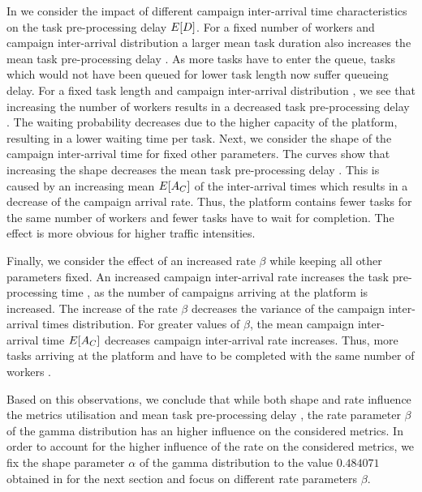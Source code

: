 In  we consider the impact of different campaign inter-arrival time characteristics \campaignIAT on the task pre-processing delay \(E[D]\).
For a fixed number of workers \numberOfWorkers and campaign inter-arrival distribution \campaignIAT a larger mean task duration \taskDuration also increases the mean task pre-processing delay \preTaskProcessingDelay. 
As more tasks have to enter the queue, tasks which would not have been queued for lower task length now suffer queueing delay.
For a fixed task length \taskDuration and campaign inter-arrival distribution \campaignIAT, we see that increasing the number of workers \numberOfWorkers results in a decreased task pre-processing delay \preTaskProcessingDelay.
The waiting probability decreases due to the higher capacity of the platform, resulting in a lower waiting time per task.
Next, we consider the shape of the campaign inter-arrival time for fixed other parameters. 
The curves show that increasing the shape decreases the mean task pre-processing delay \preTaskProcessingDelay. 
This is caused by an increasing mean \(E[A_C]\) of the inter-arrival times which results in a decrease of the campaign arrival rate.
Thus, the platform contains fewer tasks for the same number of workers \numberOfWorkers and fewer tasks have to wait for completion.
The effect is more obvious for higher traffic intensities.

Finally, we consider the effect of an increased rate \(\beta\) while keeping all other parameters fixed.
An increased campaign inter-arrival rate increases the task pre-processing time \preTaskProcessingDelay, as the number of campaigns arriving at the platform is increased.
The increase of the rate \(\beta\) decreases the variance of the campaign inter-arrival times distribution.
For greater values of \(\beta\), the mean campaign inter-arrival time \(E[A_C]\) decreases campaign inter-arrival rate increases. 
Thus, more tasks arriving at the platform and have to be completed with the same number of workers \numberOfWorkers.

Based on this observations, we conclude that while both shape and rate influence the metrics utilisation \workerUtilization and mean task pre-processing delay  \preTaskProcessingDelay, the rate parameter \(\beta\) of the gamma distribution has an higher influence on the considered metrics.
In order to account for the higher influence of the rate on the considered metrics, we fix the shape parameter \(\alpha\) of the gamma distribution to the value \(0.484071\) obtained in  for the next section and focus on different rate parameters \(\beta\).

